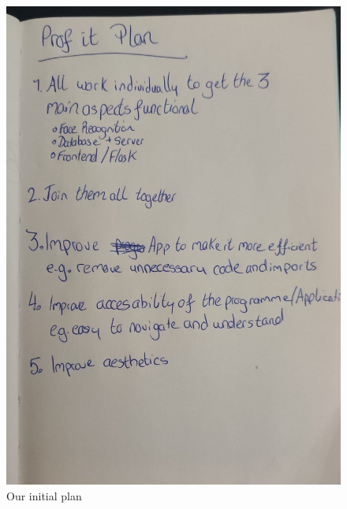 \documentclass{article}
\begin{document}
\begin{figure}[h!]
\centering
\includegraphics[scale=0.14]{images/Plan.jpg}
\caption{Our initial plan }
\end{figure}
\newpage
\end{document}
